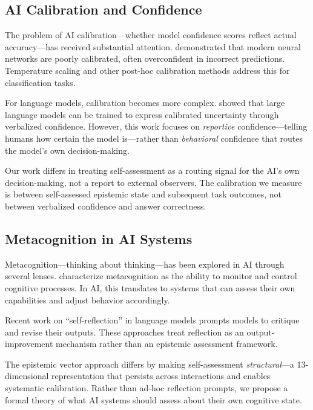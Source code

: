 
\subsection{AI Calibration and Confidence}

The problem of AI calibration---whether model confidence scores reflect actual accuracy---has received substantial attention. \citet{guo2017calibration} demonstrated that modern neural networks are poorly calibrated, often overconfident in incorrect predictions. Temperature scaling and other post-hoc calibration methods address this for classification tasks.

For language models, calibration becomes more complex. \citet{kadavath2022language} showed that large language models can be trained to express calibrated uncertainty through verbalized confidence. However, this work focuses on \emph{reportive} confidence---telling humans how certain the model is---rather than \emph{behavioral} confidence that routes the model's own decision-making.

Our work differs in treating self-assessment as a routing signal for the AI's own decision-making, not a report to external observers. The calibration we measure is between self-assessed epistemic state and subsequent task outcomes, not between verbalized confidence and answer correctness.

\subsection{Metacognition in AI Systems}

Metacognition---thinking about thinking---has been explored in AI through several lenses. \citet{fleming2012neural} characterize metacognition as the ability to monitor and control cognitive processes. In AI, this translates to systems that can assess their own capabilities and adjust behavior accordingly.

Recent work on ``self-reflection'' in language models \citep{shinn2023reflexion,madaan2023self} prompts models to critique and revise their outputs. These approaches treat reflection as an output-improvement mechanism rather than an epistemic assessment framework.

The epistemic vector approach differs by making self-assessment \emph{structural}---a 13-dimensional representation that persists across interactions and enables systematic calibration. Rather than ad-hoc reflection prompts, we propose a formal theory of what AI systems should assess about their own cognitive state.

